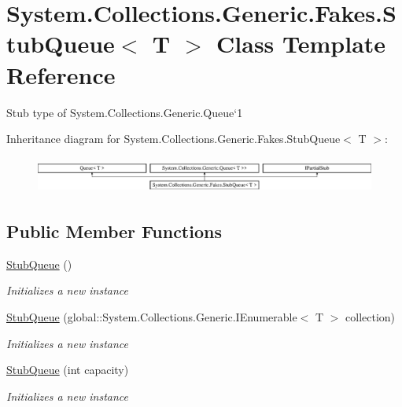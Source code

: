 \hypertarget{class_system_1_1_collections_1_1_generic_1_1_fakes_1_1_stub_queue_3_01_t_01_4}{\section{System.\-Collections.\-Generic.\-Fakes.\-Stub\-Queue$<$ T $>$ Class Template Reference}
\label{class_system_1_1_collections_1_1_generic_1_1_fakes_1_1_stub_queue_3_01_t_01_4}
}


Stub type of System.\-Collections.\-Generic.\-Queue`1 


Inheritance diagram for System.\-Collections.\-Generic.\-Fakes.\-Stub\-Queue$<$ T $>$\-:\begin{figure}[H]
\begin{center}
\leavevmode
\includegraphics[height=1.200429cm]{class_system_1_1_collections_1_1_generic_1_1_fakes_1_1_stub_queue_3_01_t_01_4}
\end{center}
\end{figure}
\subsection*{Public Member Functions}
\begin{DoxyCompactItemize}
\item 
\hyperlink{class_system_1_1_collections_1_1_generic_1_1_fakes_1_1_stub_queue_3_01_t_01_4_ae6c52bd8ffb4e46fd678f54284c0a58d}{Stub\-Queue} ()
\begin{DoxyCompactList}\small\item\em Initializes a new instance\end{DoxyCompactList}\item 
\hyperlink{class_system_1_1_collections_1_1_generic_1_1_fakes_1_1_stub_queue_3_01_t_01_4_af21ccee8a1e8d0a414ff2c772f471df2}{Stub\-Queue} (global\-::\-System.\-Collections.\-Generic.\-I\-Enumerable$<$ T $>$ collection)
\begin{DoxyCompactList}\small\item\em Initializes a new instance\end{DoxyCompactList}\item 
\hyperlink{class_system_1_1_collections_1_1_generic_1_1_fakes_1_1_stub_queue_3_01_t_01_4_ab62a3b0f712e8a15e931864ef2c05631}{Stub\-Queue} (int capacity)
\begin{DoxyCompactList}\small\item\em Initializes a new instance\end{DoxyCompactList}\end{DoxyCompactItemize}
